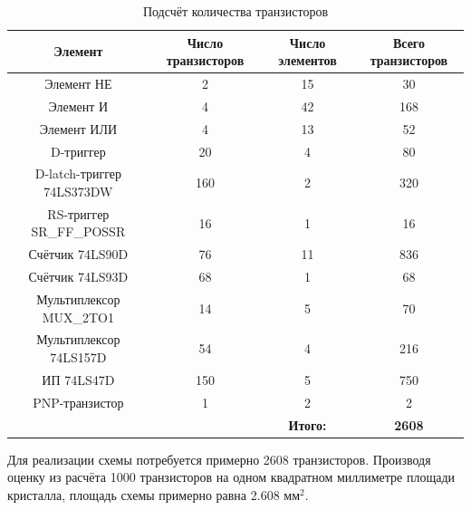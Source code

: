 \documentclass[a4paper, final]{article}
\begin{document}
\begin{table}[h!]
    \centering
    \caption{Подсчёт количества транзисторов}
    \label{tbl:area}
    \footnotesize
    \begin{tabular}{c|c|c|c}
    \textbf{Элемент} & \textbf{Число транзисторов} & \textbf{Число элементов} & \textbf{Всего транзисторов} \\
    \hline
    Элемент НЕ                            & 2   & 15  & 30\\
    Элемент И                             & 4   & 42  & 168\\
    Элемент ИЛИ                           & 4   & 13  & 52\\
    D-триггер                             & 20  & 4   & 80\\
    D-latch-триггер 74LS373DW             & 160 & 2   & 320\\
    RS-триггер SR\_FF\_POSSR              & 16  & 1   & 16\\
    Счётчик 74LS90D                       & 76  & 11  & 836\\
    Счётчик 74LS93D                       & 68  & 1   & 68\\
    Мультиплексор MUX\_2TO1               & 14  & 5   & 70\\
    Мультиплексор 74LS157D                & 54  & 4   & 216\\
    ИП 74LS47D  & 150 & 5   & 750\\
    PNP-транзистор                        & 1   & 2   & 2\\
    \hline
                                          &   & \textbf{Итого:} & \textbf{2608}             
    \end{tabular}
\end{table}

Для реализации схемы потребуется примерно 2608 транзисторов. Производя оценку из расчёта 1000 транзисторов на одном квадратном миллиметре площади кристалла, площадь
схемы примерно равна 2.608 $\text{мм}^2$.


\cleardoublepage
{}
\newpage
{}
\end{document}
